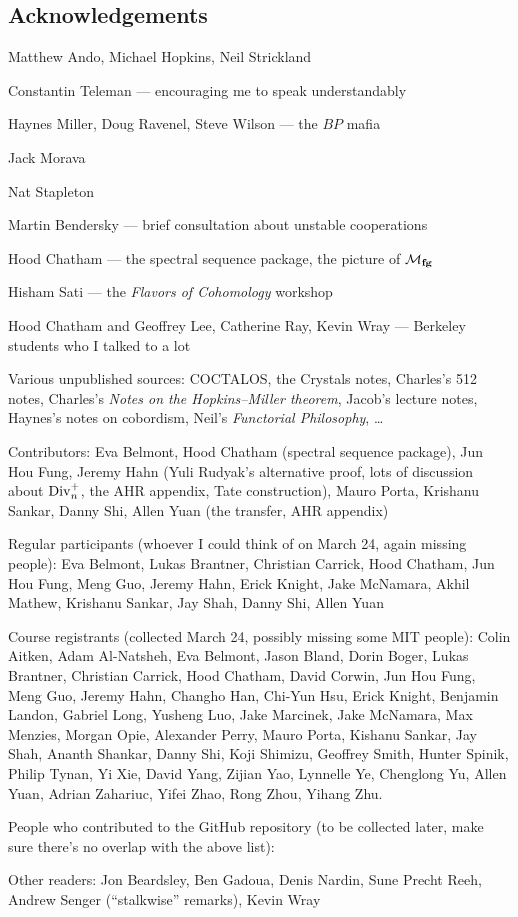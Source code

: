


\newpage

\subsection*{Acknowledgements}

Matthew Ando, Michael Hopkins, Neil Strickland

Constantin Teleman --- encouraging me to speak understandably

Haynes Miller, Doug Ravenel, Steve Wilson --- the $BP$ mafia

Jack Morava

Nat Stapleton

Martin Bendersky --- brief consultation about unstable cooperations

Hood Chatham --- the spectral sequence package, the picture of $\mathcal{M}_{\mathbf{fg}}$

Hisham Sati --- the \textit{Flavors of Cohomology} workshop

Hood Chatham and Geoffrey Lee, Catherine Ray, Kevin Wray --- Berkeley students who I talked to a lot

Various unpublished sources: COCTALOS, the Crystals notes, Charles's 512 notes, Charles's \textit{Notes on the Hopkins--Miller theorem}, Jacob's lecture notes, Haynes's notes on cobordism, Neil's \textit{Functorial Philosophy}, \ldots





Contributors: Eva Belmont, Hood Chatham (spectral sequence package), Jun Hou Fung, Jeremy Hahn (Yuli Rudyak's alternative proof, lots of discussion about $\operatorname{Div}_n^+$, the AHR appendix, Tate construction), Mauro Porta, Krishanu Sankar, Danny Shi, Allen Yuan (the transfer, AHR appendix)

Regular participants (whoever I could think of on March 24, again missing people): Eva Belmont, Lukas Brantner, Christian Carrick, Hood Chatham, Jun Hou Fung, Meng Guo, Jeremy Hahn, Erick Knight, Jake McNamara, Akhil Mathew, Krishanu Sankar, Jay Shah, Danny Shi, Allen Yuan

Course registrants (collected March 24, possibly missing some MIT people): Colin Aitken, Adam Al-Natsheh, Eva Belmont, Jason Bland, Dorin Boger, Lukas Brantner, Christian Carrick, Hood Chatham, David Corwin, Jun Hou Fung, Meng Guo, Jeremy Hahn, Changho Han, Chi-Yun Hsu, Erick Knight, Benjamin Landon, Gabriel Long, Yusheng Luo, Jake Marcinek, Jake McNamara, Max Menzies, Morgan Opie, Alexander Perry, Mauro Porta, Kishanu Sankar, Jay Shah, Ananth Shankar, Danny Shi, Koji Shimizu, Geoffrey Smith, Hunter Spinik, Philip Tynan, Yi Xie, David Yang, Zijian Yao, Lynnelle Ye, Chenglong Yu, Allen Yuan, Adrian Zahariuc, Yifei Zhao, Rong Zhou, Yihang Zhu.

People who contributed to the GitHub repository (to be collected later, make sure there's no overlap with the above list): 

Other readers: Jon Beardsley, Ben Gadoua, Denis Nardin, Sune Precht Reeh, Andrew Senger (``stalkwise'' remarks), Kevin Wray

